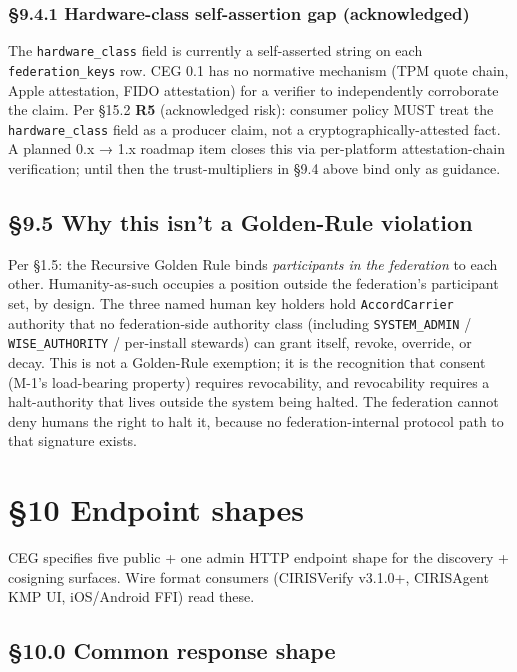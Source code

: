\documentclass[11pt]{article}
\begin{document}
\subsubsection*{§9.4.1 Hardware-class self-assertion gap (acknowledged)}


The \texttt{hardware\_class} field is currently a self-asserted string on each \texttt{federation\_keys} row. CEG 0.1 has no normative mechanism (TPM quote chain, Apple attestation, FIDO attestation) for a verifier to independently corroborate the claim. Per §15.2 \textbf{R5} (acknowledged risk): consumer policy MUST treat the \texttt{hardware\_class} field as a producer claim, not a cryptographically-attested fact. A planned 0.x → 1.x roadmap item closes this via per-platform attestation-chain verification; until then the trust-multipliers in §9.4 above bind only as guidance.


\subsection*{§9.5 Why this isn't a Golden-Rule violation}


Per §1.5: the Recursive Golden Rule binds \textit{participants in the federation} to each other. Humanity-as-such occupies a position outside the federation's participant set, by design. The three named human key holders hold \texttt{AccordCarrier} authority that no federation-side authority class (including \texttt{SYSTEM\_ADMIN} / \texttt{WISE\_AUTHORITY} / per-install stewards) can grant itself, revoke, override, or decay. This is not a Golden-Rule exemption; it is the recognition that consent (M-1's load-bearing property) requires revocability, and revocability requires a halt-authority that lives outside the system being halted. The federation cannot deny humans the right to halt it, because no federation-internal protocol path to that signature exists.




\clearpage


\section*{§10 Endpoint shapes}


CEG specifies five public + one admin HTTP endpoint shape for the discovery + cosigning surfaces. Wire format consumers (CIRISVerify v3.1.0+, CIRISAgent KMP UI, iOS/Android FFI) read these.


\subsection*{§10.0 Common response shape}
\end{document}
